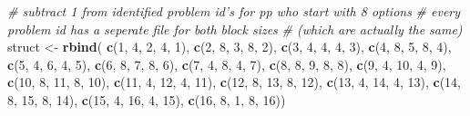 \documentclass[11pt,,]{article}
\newenvironment{Shaded}{\begin{snugshade}}{\end{snugshade}}
\newcommand{\KeywordTok}[1]{\textcolor[rgb]{0.13,0.29,0.53}{\textbf{{#1}}}}
\newcommand{\DecValTok}[1]{\textcolor[rgb]{0.00,0.00,0.81}{{#1}}}
\newcommand{\StringTok}[1]{\textcolor[rgb]{0.31,0.60,0.02}{{#1}}}
\newcommand{\CommentTok}[1]{\textcolor[rgb]{0.56,0.35,0.01}{\textit{{#1}}}}
\newcommand{\NormalTok}[1]{{#1}}
\begin{document}
\begin{Shaded}
\begin{Highlighting}[]
{{{{{\CommentTok{# subtract 1 from identified problem id's for pp who start with 8 options}
\CommentTok{# every problem id has a seperate file for both block sizes }
\CommentTok{# (which are actually the same)}
\NormalTok{struct <-}\StringTok{ }\KeywordTok{rbind}\NormalTok{(}
\KeywordTok{c}\NormalTok{(}\DecValTok{1}\NormalTok{, }\DecValTok{4}\NormalTok{, }\DecValTok{2}\NormalTok{, }\DecValTok{4}\NormalTok{, }\DecValTok{1}\NormalTok{),}
\KeywordTok{c}\NormalTok{(}\DecValTok{2}\NormalTok{, }\DecValTok{8}\NormalTok{, }\DecValTok{3}\NormalTok{, }\DecValTok{8}\NormalTok{, }\DecValTok{2}\NormalTok{),}
\KeywordTok{c}\NormalTok{(}\DecValTok{3}\NormalTok{, }\DecValTok{4}\NormalTok{, }\DecValTok{4}\NormalTok{, }\DecValTok{4}\NormalTok{, }\DecValTok{3}\NormalTok{),}
\KeywordTok{c}\NormalTok{(}\DecValTok{4}\NormalTok{, }\DecValTok{8}\NormalTok{, }\DecValTok{5}\NormalTok{, }\DecValTok{8}\NormalTok{, }\DecValTok{4}\NormalTok{),}
\KeywordTok{c}\NormalTok{(}\DecValTok{5}\NormalTok{, }\DecValTok{4}\NormalTok{, }\DecValTok{6}\NormalTok{, }\DecValTok{4}\NormalTok{, }\DecValTok{5}\NormalTok{),}
\KeywordTok{c}\NormalTok{(}\DecValTok{6}\NormalTok{, }\DecValTok{8}\NormalTok{, }\DecValTok{7}\NormalTok{, }\DecValTok{8}\NormalTok{, }\DecValTok{6}\NormalTok{),}
\KeywordTok{c}\NormalTok{(}\DecValTok{7}\NormalTok{, }\DecValTok{4}\NormalTok{, }\DecValTok{8}\NormalTok{, }\DecValTok{4}\NormalTok{, }\DecValTok{7}\NormalTok{),}
\KeywordTok{c}\NormalTok{(}\DecValTok{8}\NormalTok{, }\DecValTok{8}\NormalTok{, }\DecValTok{9}\NormalTok{, }\DecValTok{8}\NormalTok{, }\DecValTok{8}\NormalTok{),}
\KeywordTok{c}\NormalTok{(}\DecValTok{9}\NormalTok{, }\DecValTok{4}\NormalTok{, }\DecValTok{10}\NormalTok{, }\DecValTok{4}\NormalTok{, }\DecValTok{9}\NormalTok{),}
\KeywordTok{c}\NormalTok{(}\DecValTok{10}\NormalTok{, }\DecValTok{8}\NormalTok{, }\DecValTok{11}\NormalTok{, }\DecValTok{8}\NormalTok{, }\DecValTok{10}\NormalTok{),}
\KeywordTok{c}\NormalTok{(}\DecValTok{11}\NormalTok{, }\DecValTok{4}\NormalTok{, }\DecValTok{12}\NormalTok{, }\DecValTok{4}\NormalTok{, }\DecValTok{11}\NormalTok{),}
\KeywordTok{c}\NormalTok{(}\DecValTok{12}\NormalTok{, }\DecValTok{8}\NormalTok{, }\DecValTok{13}\NormalTok{, }\DecValTok{8}\NormalTok{, }\DecValTok{12}\NormalTok{),}
\KeywordTok{c}\NormalTok{(}\DecValTok{13}\NormalTok{, }\DecValTok{4}\NormalTok{, }\DecValTok{14}\NormalTok{, }\DecValTok{4}\NormalTok{, }\DecValTok{13}\NormalTok{),}
\KeywordTok{c}\NormalTok{(}\DecValTok{14}\NormalTok{, }\DecValTok{8}\NormalTok{, }\DecValTok{15}\NormalTok{, }\DecValTok{8}\NormalTok{, }\DecValTok{14}\NormalTok{),}
\KeywordTok{c}\NormalTok{(}\DecValTok{15}\NormalTok{, }\DecValTok{4}\NormalTok{, }\DecValTok{16}\NormalTok{, }\DecValTok{4}\NormalTok{, }\DecValTok{15}\NormalTok{),}
\KeywordTok{c}\NormalTok{(}\DecValTok{16}\NormalTok{, }\DecValTok{8}\NormalTok{, }\DecValTok{1}\NormalTok{, }\DecValTok{8}\NormalTok{, }\DecValTok{16}\NormalTok{))}

}}}}}
\end{Highlighting}
\end{Shaded}
\end{document}
